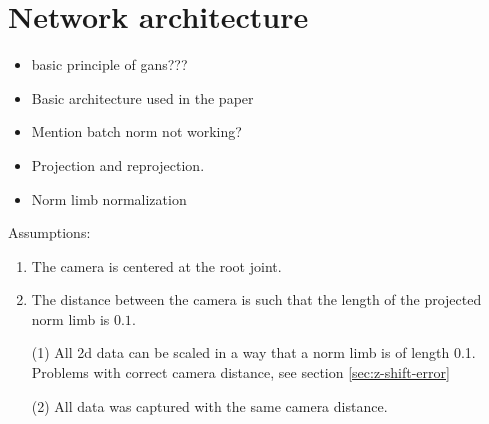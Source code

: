 \section{Network architecture}\label{sec:network}
\begin{itemize}
	\item basic principle of gans???
	\item Basic architecture used in the paper
	\item Mention batch norm not working?
	\item Projection and reprojection.
	\item Norm limb normalization
\end{itemize}

Assumptions:
\begin{enumerate}
	\item The camera is centered at the root joint.
	\item The distance between the camera is such that the length of the projected norm limb is $0.1$. 
\end{enumerate}
\begin{itemize}
	\item[(1)] All 2d data can be scaled in a way that a norm limb is of length 0.1. 
	Problems with correct camera distance, see section \ref{sec:z-shift-error}
	\item[(2)] All data was captured with the same camera distance.
\end{itemize}